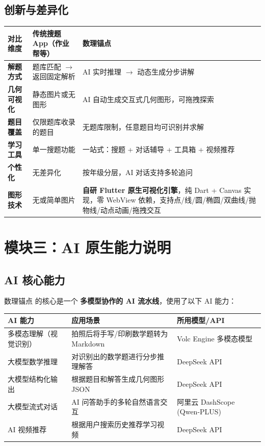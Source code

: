 \documentclass[12pt, a4paper]{ctexart}
\begin{document}
\subsection{创新与差异化}
\begin{center}
\begin{tabular}{|p{2cm}|p{5cm}|p{5cm}|}
\hline
\textbf{对比维度} & \textbf{传统搜题 App（作业帮等）} & \textbf{数理锚点} \\ \hline
\textbf{解题方式} & 题库匹配 $\rightarrow$ 返回固定解析 & AI 实时推理 $\rightarrow$ 动态生成分步讲解 \\ \hline
\textbf{几何可视化} & 静态图片或无图形 & AI 自动生成交互式几何图形，可拖拽探索 \\ \hline
\textbf{题目覆盖} & 仅限题库收录的题目 & 无题库限制，任意题目均可识别并求解 \\ \hline
\textbf{学习工具} & 单一搜题功能 & 一站式：搜题 + 对话辅导 + 工具箱 + 视频推荐 \\ \hline
\textbf{个性化} & 无差异化 & 按年级分层，AI 对话支持多轮追问 \\ \hline
\textbf{图形技术} & 无或简单图片 & \textbf{自研 Flutter 原生可视化引擎}，纯 Dart + Canvas 实现，零 WebView 依赖，支持点/线/圆/椭圆/双曲线/抛物线/动点动画/拖拽交互 \\ \hline
\end{tabular}
\end{center}

\section{模块三：AI 原生能力说明}

\subsection{AI 核心能力}
数理锚点 的核心是一个 \textbf{多模型协作的 AI 流水线}，使用了以下 AI 能力：
\begin{center}
\begin{tabular}{|p{4cm}|p{4cm}|p{4cm}|}
\hline
\textbf{AI 能力} & \textbf{应用场景} & \textbf{所用模型/API} \\ \hline
多模态理解（视觉识别） & 拍照后将手写/印刷数学题转为 Markdown & Volc Engine 多模态模型 \\ \hline
大模型数学推理 & 对识别出的数学题进行分步推理解答 & DeepSeek API \\ \hline
大模型结构化输出 & 根据题目和解答生成几何图形 JSON & DeepSeek API \\ \hline
大模型流式对话 & AI 问答助手的多轮自然语言交互 & 阿里云 DashScope (Qwen-PLUS) \\ \hline
AI 视频推荐 & 根据用户搜索历史推荐学习视频 & DeepSeek API \\ \hline
\end{tabular}
\end{center}
\end{document}
